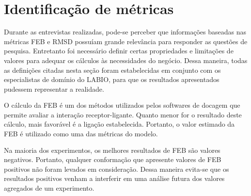 \begin{table}[h]
\caption{Questões de pesquisa identificadas pelos especialistas com maior relevância para análise de experimentos de docagem}
\label{tab:questaoNegocio}
\centering
{}
\end{table}

\section{Identificação de métricas}
\label{sec:IdentificacaoDeMetricas}

Durante as entrevistas realizadas, pode-se perceber que informações baseadas nas métricas FEB e RMSD possuíam grande relevância para responder as questões de pesquisa. Entretanto foi necessário definir certas propriedades e limitações de valores para adequar os cálculos às necessidades do negócio. Dessa maneira, todas as definições citadas nesta seção foram estabelecidas em conjunto com os especialistas de domínio do LABIO, para que os resultados apresentados pudessem representar a realidade.

O cálculo da FEB é um dos métodos utilizados pelos softwares de docagem que permite avaliar a interação receptor-ligante. Quanto menor for o resultado deste cálculo, mais favorável é a ligação estabelecida. Portanto, o valor estimado da FEB é utilizado como uma das métricas do modelo.

Na maioria dos experimentos, os melhores resultados de FEB são valores negativos. Portanto, qualquer conformação que apresente valores de FEB positivos não foram levados em consideração. Dessa maneira evita-se que os resultados positivos venham a interferir em uma análise futura dos valores agregados de um experimento. 

